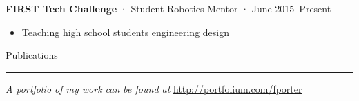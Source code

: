 \documentclass[12pt, oneside]{article}
\newcommand{\headingstyleJobs}[1] {
	{\fontsize{19pt}{1em}\selectfont \textcolor{new_red}{\textsf{#1}}}
	\textcolor{new_red}{\rule{3.25in}{0.5pt}} \vspace{3pt}
}
\newcommand{\jobtitle}[3] {
	{\bf #1} · {#2} · {#3} \vspace{-10pt} \\
}
\begin{document}
\begin{flushleft}
\jobtitle{FIRST Tech Challenge}{Student Robotics Mentor}{June 2015–Present}
\begin{itemize}
	\item Teaching high school students engineering design
\end{itemize}




\headingstyleJobs{Publications}

\vspace{-9pt}
\nocite{OWMS-DSA}




\textit{A portfolio of my work can be found at} \url{http://portfolium.com/fporter}

\end{flushleft}
\end{document}
